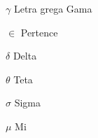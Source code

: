 
\begin{simbolos}
  \item[$ \gamma $] Letra grega Gama
  \item[$ \in $] Pertence
  \item[$ \delta$] Delta
  \item[$ \theta$] Teta
  \item[$ \sigma$] Sigma
  \item[$ \mu$] Mi
  
\end{simbolos}
